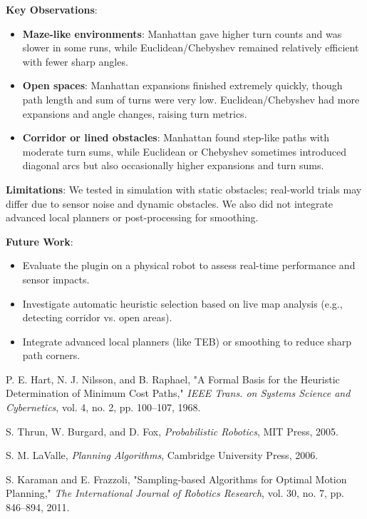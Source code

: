 \documentclass[letterpaper, 10 pt, conference]{ieeeconf}
\begin{document}
\textbf{Key Observations}:
\begin{itemize}
    \item \textbf{Maze-like environments}: Manhattan gave higher turn counts and was slower 
    in some runs, while Euclidean/Chebyshev remained relatively efficient with fewer sharp angles.
    \item \textbf{Open spaces}: Manhattan expansions finished extremely quickly, though path length 
    and sum of turns were very low. Euclidean/Chebyshev had more expansions and angle changes, raising turn metrics.
    \item \textbf{Corridor or lined obstacles}: Manhattan found step-like paths with moderate turn sums, 
    while Euclidean or Chebyshev sometimes introduced diagonal arcs but also occasionally higher expansions and turn sums.
\end{itemize}

\textbf{Limitations}: We tested in simulation with static obstacles; real-world trials may differ due to sensor noise and dynamic obstacles. We also did not integrate 
advanced local planners or post-processing for smoothing.  

\textbf{Future Work}: 
\begin{itemize}
    \item Evaluate the plugin on a physical robot to assess real-time performance and sensor impacts.
    \item Investigate automatic heuristic selection based on live map analysis (e.g., detecting corridor vs. open areas).
    \item Integrate advanced local planners (like TEB) or smoothing to reduce sharp path corners.
\end{itemize}


% 

\begin{thebibliography}{1}

 P. E. Hart, N. J. Nilsson, and B. Raphael, "A Formal Basis for the Heuristic Determination of Minimum Cost Paths," \textit{IEEE Trans. on Systems Science and Cybernetics}, vol. 4, no. 2, pp. 100--107, 1968.

 S. Thrun, W. Burgard, and D. Fox, \textit{Probabilistic Robotics}, MIT Press, 2005.

 S. M. LaValle, \textit{Planning Algorithms}, Cambridge University Press, 2006.

 S. Karaman and E. Frazzoli, "Sampling-based Algorithms for Optimal Motion Planning," \textit{The International Journal of Robotics Research}, vol. 30, no. 7, pp. 846--894, 2011.

\end{thebibliography}
\end{document}
